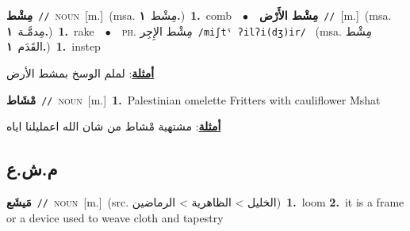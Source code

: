 \documentclass[10pt,a4paper,twoside]{article} %
\begin{document}
\begin{multicols}{2}
{\setlength\topsep{0pt}\textbf{\foreignlanguage{arabic}{مِشْط}}\ {\color{gray}\texttt{//}\color{black}}\ \textsc{noun}\ [m.]\ \color{gray}(msa. \foreignlanguage{arabic}{مِشْط}~\foreignlanguage{arabic}{\textbf{١.}})\color{black}\ \textbf{1.}~comb\ \ $\bullet$\ \ \setlength\topsep{0pt}\textbf{\foreignlanguage{arabic}{مِشْط الأَرْض}}\ {\color{gray}\texttt{//}\color{black}}\ [m.]\ \color{gray}(msa. \foreignlanguage{arabic}{مِدمَّـة}~\foreignlanguage{arabic}{\textbf{١.}})\color{black}\ \textbf{1.}~rake\ \ $\bullet$\ \ \textsc{ph.} \color{gray} \foreignlanguage{arabic}{مِشْط الإِجِر}\color{black}\ {\color{gray}\texttt{/{\sffamily miʃtˤ ʔilʔi(dʒ)ir}/}\color{black}}\ \color{gray} (msa. \foreignlanguage{arabic}{مِشْط القَدَم}~\foreignlanguage{arabic}{\textbf{١.}})\color{black}\ \textbf{1.}~instep\  \begin{flushright}\color{gray}\foreignlanguage{arabic}{\textbf{\underline{\foreignlanguage{arabic}{أمثلة}}}: لملم الوسخ بمشط الأرض}\end{flushright}\color{black}} \vspace{2mm}

{\setlength\topsep{0pt}\textbf{\foreignlanguage{arabic}{مْشَاط}}\ {\color{gray}\texttt{//}\color{black}}\ \textsc{noun}\ [m.]\ \textbf{1.}~Palestinian omelette Fritters with cauliflower Mshat\  \begin{flushright}\color{gray}\foreignlanguage{arabic}{\textbf{\underline{\foreignlanguage{arabic}{أمثلة}}}: مشتهية مْشاط من شان الله اعمليلنا اياه}\end{flushright}\color{black}} \vspace{2mm}

\vspace{-3mm}
\subsection*{\color{blue}\foreignlanguage{arabic}{م.ش.ع}\color{blue}{ (ntws)}} 

{\setlength\topsep{0pt}\textbf{\foreignlanguage{arabic}{مَيشَع}}\ {\color{gray}\texttt{//}\color{black}}\ \textsc{noun}\ [m.]\ (src. \color{gray}\foreignlanguage{arabic}{الخليل > الظاهرية > الرماضين}\color{black})\ \textbf{1.}~loom  \textbf{2.}~it is a frame  or a device used to weave cloth and tapestry\ } \vspace{2mm}


\end{multicols}
\end{document}
